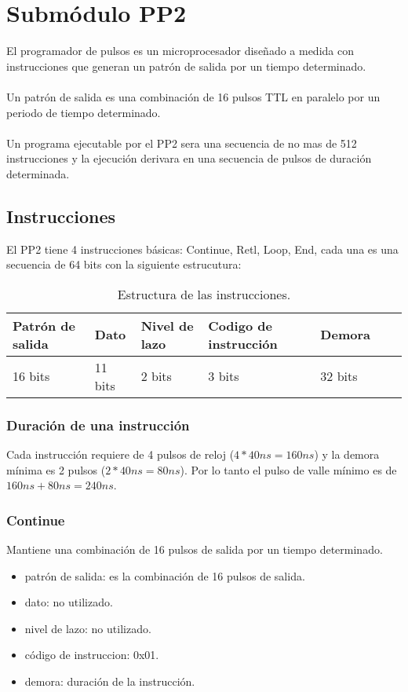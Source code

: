 \section{Subm\'odulo PP2}

El programador de pulsos es un microprocesador dise\~nado a medida con instrucciones que generan
un patr\'on de salida por un tiempo determinado.
\\\\
Un patr\'on de salida es una combinaci\'on de 16 pulsos TTL en paralelo por un periodo 
de tiempo determinado.
\\\\
Un programa ejecutable por el PP2 sera una secuencia de no mas de 512 instrucciones 
y la ejecuci\'on derivara en una secuencia de pulsos de duraci\'on determinada.

\subsection{Instrucciones}

El PP2 tiene 4 instrucciones b\'asicas: Continue, Retl, Loop, End, 
cada una es una secuencia de 64 bits con la siguiente estrucutura:\\
\begin{table}[ht]
    \centering
    \begin{tabular}{|l|l|l|l|l|l|l|}
    \hline
    Patr\'on de salida  & Dato & Nivel de lazo & Codigo de instrucci\'on & Demora \\
    \hline
    16 bits & 11 bits & 2 bits & 3 bits & 32 bits\\
    \hline
\end{tabular}
\caption{\label{tab:pp2_ins}Estructura de las instrucciones.}
\end{table}


\subsubsection{Duraci\'on de una instrucci\'on}
Cada instrucci\'on requiere de 4 pulsos de reloj ($4 * 40ns = 160ns$) 
y la demora m\'inima es 2 pulsos ($2 * 40ns = 80ns$). Por lo tanto el pulso de
valle m\'inimo es de $160ns + 80ns = 240ns$.

\subsubsection{Continue}
Mantiene una combinaci\'on de 16 pulsos de salida por un tiempo determinado.
\begin{itemize}
    \item patr\'on de salida: es la combinaci\'on de 16 pulsos de salida.
    \item dato: no utilizado.
    \item nivel de lazo: no utilizado.
    \item c\'odigo de instruccion: 0x01.
    \item demora: duraci\'on de la instrucci\'on.
\end{itemize}


